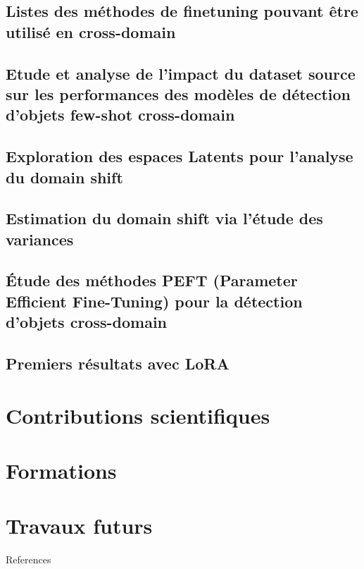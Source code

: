 \documentclass[xcolor=table, 8pt]{beamer}
\begin{document}
    \subsection{Listes des méthodes de finetuning pouvant être utilisé en cross-domain}\label{subsec:fs-od-cd-sota}
    
    

    \subsection{Etude et analyse de l'impact du dataset source sur les performances des modèles de détection d'objets few-shot cross-domain}\label{subsec:srcdata}
    


    \subsection{Exploration des espaces Latents pour l'analyse du domain shift}\label{subsec:results-embeddings}
    
    
    \subsection{Estimation du domain shift via l'étude des variances}\label{subsec:results-variances}
    
    

    \subsection{Étude des méthodes PEFT (Parameter Efficient Fine-Tuning) pour la détection d'objets cross-domain}\label{sec:peft}
    
    

    \subsection{Premiers résultats avec LoRA}\label{subsec:results-loracurves}
    




    \section{Contributions scientifiques}\label{subsec:approach-publications}
    

    \section{Formations}\label{subsec:formations}
    

    \section{Travaux futurs}\label{subsec:approach-future-work}
    



    \begin{frame}[allowframebreaks=]{References}
        \printbibliography
    \end{frame}
\end{document}
